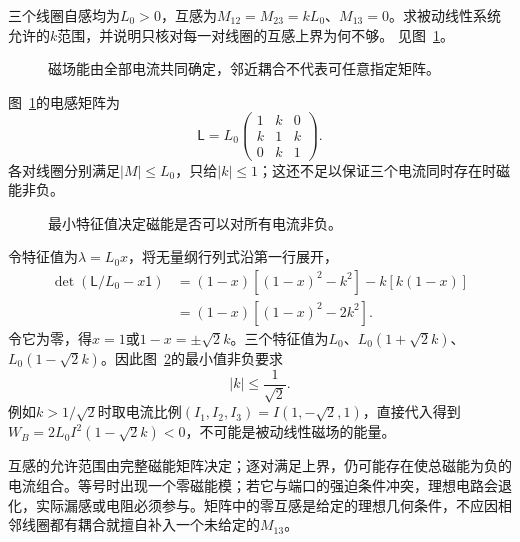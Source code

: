 \begin{exercise}[三线圈的互感是否物理允许]\label{ex:i2-h5}
三个线圈自感均为$L_0>0$，互感为$M_{12}=M_{23}=kL_0$、$M_{13}=0$。求被动线性系统允许的$k$范围，并说明只核对每一对线圈的互感上界为何不够。 见图~\ref{fig:i2-h5-q}。
\end{exercise}

\begin{figure}[H]\centering
{}
\caption{磁场能由全部电流共同确定，邻近耦合不代表可任意指定矩阵。}\label{fig:i2-h5-q}
\end{figure}
\begin{solution}
图~\ref{fig:i2-h5-q}的电感矩阵为
\[\mathsf L=L_0
\begin{pmatrix}1&k&0\\k&1&k\\0&k&1\end{pmatrix}.
\]
各对线圈分别满足$|M|\le L_0$，只给$|k|\le1$；这还不足以保证三个电流同时存在时磁能非负。


\begin{figure}[H]\centering
{}
\caption{最小特征值决定磁能是否可以对所有电流非负。}\label{fig:i2-h5-s}
\end{figure}

令特征值为$\lambda=L_0x$，将无量纲行列式沿第一行展开，
\[\begin{aligned}
\det(\mathsf L/L_0-x\mathsf 1)
&=(1-x)[(1-x)^2-k^2]-k[k(1-x)]\\
&=(1-x)[(1-x)^2-2k^2].
\end{aligned}\]
令它为零，得$x=1$或$1-x=\pm\sqrt2k$。三个特征值为$L_0$、$L_0(1+\sqrt2k)$、$L_0(1-\sqrt2k)$。因此图~\ref{fig:i2-h5-s}的最小值非负要求
\[\boxed{|k|\le\frac1{\sqrt2}}.
\]
例如$k>1/\sqrt2$时取电流比例$(I_1,I_2,I_3)=I(1,-\sqrt2,1)$，直接代入得到$W_B=2L_0I^2(1-\sqrt2k)<0$，不可能是被动线性磁场的能量。

互感的允许范围由完整磁能矩阵决定；逐对满足上界，仍可能存在使总磁能为负的电流组合。等号时出现一个零磁能模；若它与端口的强迫条件冲突，理想电路会退化，实际漏感或电阻必须参与。矩阵中的零互感是给定的理想几何条件，不应因相邻线圈都有耦合就擅自补入一个未给定的$M_{13}$。
\end{solution}

